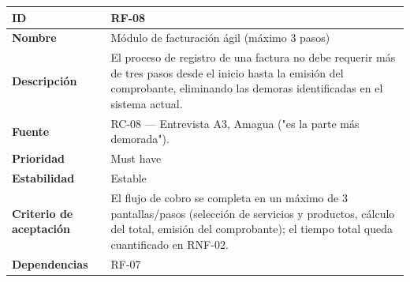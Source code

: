 \documentclass[
]{article}
\newcounter{none} %
\begin{document}
{\def\LTcaptype{none} %
\begin{longtable}[]{@{}
  >{\raggedright\arraybackslash}p{}
  >{\raggedright\arraybackslash}p{}@{}}
\toprule\noalign{}
\begin{minipage}[b]{\linewidth}\raggedright
\textbf{ID}
\end{minipage} & \begin{minipage}[b]{\linewidth}\raggedright
RF-08
\end{minipage} \\
\midrule\noalign{}
\endhead
\bottomrule\noalign{}
\endlastfoot
\textbf{Nombre} & \begin{minipage}[t]{\linewidth}\raggedright
Módulo de facturación ágil (máximo 3 pasos)
\end{minipage} \\
\textbf{Descripción} & \begin{minipage}[t]{\linewidth}\raggedright
El proceso de registro de una factura no debe requerir más de tres pasos
desde el inicio hasta la emisión del comprobante, eliminando las demoras
identificadas en el sistema actual.
\end{minipage} \\
\textbf{Fuente} & \begin{minipage}[t]{\linewidth}\raggedright
RC-08 --- Entrevista A3, Amagua ("es la parte más demorada").
\end{minipage} \\
\textbf{Prioridad} & \begin{minipage}[t]{\linewidth}\raggedright
Must have
\end{minipage} \\
\textbf{Estabilidad} & \begin{minipage}[t]{\linewidth}\raggedright
Estable
\end{minipage} \\
\textbf{Criterio de aceptación} &
\begin{minipage}[t]{\linewidth}\raggedright
El flujo de cobro se completa en un máximo de 3 pantallas/pasos
(selección de servicios y productos, cálculo del total, emisión del
comprobante); el tiempo total queda cuantificado en RNF-02.
\end{minipage} \\
\textbf{Dependencias} & \begin{minipage}[t]{\linewidth}\raggedright
RF-07
\end{minipage} \\
\end{longtable}
}
\end{document}
